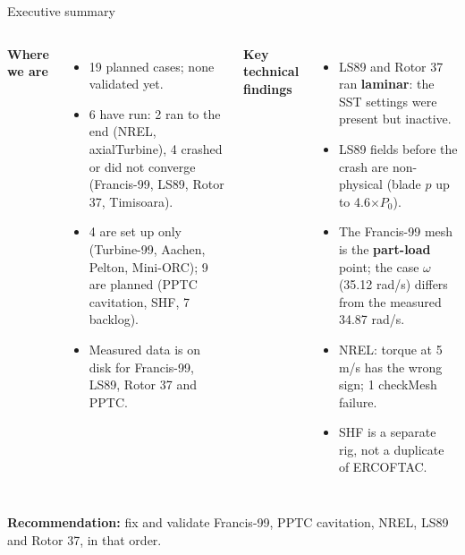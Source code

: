 \documentclass[aspectratio=169,10pt]{beamer}
\begin{document}
\begin{frame}{Executive summary}
\small
\begin{columns}[T]
\textbf{Where we are}
\begin{itemize}
\item 19 planned cases; none validated yet.
\item 6 have run: 2 ran to the end (NREL, axialTurbine), 4 crashed or did not converge (Francis-99, LS89, Rotor 37, Timisoara).
\item 4 are set up only (Turbine-99, Aachen, Pelton, Mini-ORC); 9 are planned (PPTC cavitation, SHF, 7 backlog).
\item Measured data is on disk for Francis-99, LS89, Rotor 37 and PPTC.
\end{itemize}
\textbf{Key technical findings}
\begin{itemize}
\item LS89 and Rotor 37 ran \textbf{laminar}: the SST settings were present but inactive.
\item LS89 fields before the crash are non-physical (blade $p$ up to 4.6$\times P_0$).
\item The Francis-99 mesh is the \textbf{part-load} point; the case $\omega$ (35.12 rad/s) differs from the measured 34.87 rad/s.
\item NREL: torque at 5 m/s has the wrong sign; 1 checkMesh failure.
\item SHF is a separate rig, not a duplicate of ERCOFTAC.
\end{itemize}
\end{columns}
\vspace{1mm}
\textbf{Recommendation:} fix and validate Francis-99, PPTC cavitation, NREL, LS89 and Rotor 37, in that order.
\end{frame}
\end{document}

